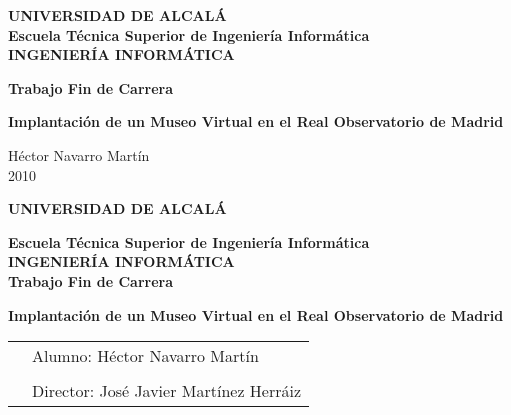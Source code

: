 \thispagestyle{empty}
\large
\vspace{3cm}
\begin{center}

{
\Large\textbf{UNIVERSIDAD DE ALCALÁ}}  \\
\vspace{1cm}
\textbf{Escuela Técnica Superior de Ingeniería Informática}\\

\vspace{1cm}
{\Large\textbf{INGENIERÍA INFORMÁTICA}}\\
\vspace{15mm}
\vspace{1cm}

\textbf{Trabajo Fin de Carrera}\\
\vspace{2cm}   

{\LARGE \textbf{Implantación de un Museo Virtual en el Real Observatorio de Madrid}}

\end{center}
\vspace{4cm}
\begin{flushright}
  Héctor Navarro Martín\\
  2010
\end{flushright}

\newpage
\clearemptydoublepage
\thispagestyle{empty}
\large
\begin{center}
{\Large\textbf{UNIVERSIDAD DE ALCALÁ}}  \\
\vspace{7mm}

\textbf{Escuela Técnica Superior de Ingeniería Informática}\\

\vspace{7mm}
{\Large\textbf{INGENIERÍA INFORMÁTICA}}\\
\vspace{2cm}
\textbf{Trabajo Fin de Carrera}\\
\vspace{2cm}   

{\Large \textbf{Implantación de un Museo Virtual en el Real Observatorio de Madrid}}

\end{center}
\vspace{2cm}
\noindent
\begin{tabular}{p{5cm}l}
&Alumno: Héctor Navarro Martín\\
&\\
&Director: José Javier Martínez Herráiz
\end{tabular}

